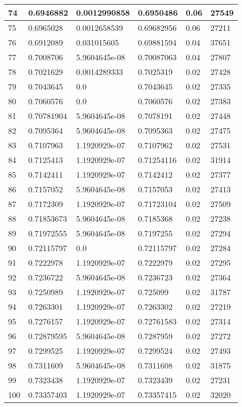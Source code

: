 \begin{longtable}{|l|l|l|l|l|l|}
74 & 0.6946882 & 0.0012990858 & 0.6950486 & 0.06 & 27549 \\ \hline 
75 & 0.6965028 & 0.0012658539 & 0.69682956 & 0.06 & 27211 \\ \hline 
76 & 0.6912089 & 0.031015605 & 0.69881594 & 0.04 & 37651 \\ \hline 
77 & 0.7008706 & 5.9604645e-08 & 0.70087063 & 0.04 & 27807 \\ \hline 
78 & 0.7021629 & 0.0014289333 & 0.7025319 & 0.02 & 27428 \\ \hline 
79 & 0.7043645 & 0.0 & 0.7043645 & 0.02 & 27335 \\ \hline 
80 & 0.7060576 & 0.0 & 0.7060576 & 0.02 & 27383 \\ \hline 
81 & 0.70781904 & 5.9604645e-08 & 0.7078191 & 0.02 & 27448 \\ \hline 
82 & 0.7095364 & 5.9604645e-08 & 0.7095363 & 0.02 & 27475 \\ \hline 
83 & 0.7107963 & 1.1920929e-07 & 0.7107962 & 0.02 & 27531 \\ \hline 
84 & 0.7125413 & 1.1920929e-07 & 0.71254116 & 0.02 & 31914 \\ \hline 
85 & 0.7142411 & 1.1920929e-07 & 0.7142412 & 0.02 & 27377 \\ \hline 
86 & 0.7157052 & 5.9604645e-08 & 0.7157053 & 0.02 & 27413 \\ \hline 
87 & 0.7172309 & 1.1920929e-07 & 0.71723104 & 0.02 & 27509 \\ \hline 
88 & 0.71853673 & 5.9604645e-08 & 0.7185368 & 0.02 & 27238 \\ \hline 
89 & 0.71972555 & 5.9604645e-08 & 0.7197255 & 0.02 & 27294 \\ \hline 
90 & 0.72115797 & 0.0 & 0.72115797 & 0.02 & 27284 \\ \hline 
91 & 0.7222978 & 1.1920929e-07 & 0.7222979 & 0.02 & 27295 \\ \hline 
92 & 0.7236722 & 5.9604645e-08 & 0.7236723 & 0.02 & 27364 \\ \hline 
93 & 0.7250989 & 1.1920929e-07 & 0.725099 & 0.02 & 31787 \\ \hline 
94 & 0.7263301 & 1.1920929e-07 & 0.7263302 & 0.02 & 27219 \\ \hline 
95 & 0.7276157 & 1.1920929e-07 & 0.72761583 & 0.02 & 27314 \\ \hline 
96 & 0.72879595 & 5.9604645e-08 & 0.7287959 & 0.02 & 27272 \\ \hline 
97 & 0.7299525 & 1.1920929e-07 & 0.7299524 & 0.02 & 27493 \\ \hline 
98 & 0.7311609 & 5.9604645e-08 & 0.7311608 & 0.02 & 31875 \\ \hline 
99 & 0.7323438 & 1.1920929e-07 & 0.7323439 & 0.02 & 27231 \\ \hline 
100 & 0.73357403 & 1.1920929e-07 & 0.73357415 & 0.02 & 32020 \\ \hline 
\end{longtable}